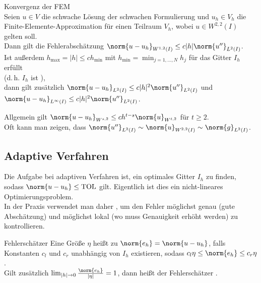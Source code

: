\begin{Satz}{Konvergenz der FEM}\\
    Seien $u \in V$ die schwache Lösung der schwachen Formulierung und
    $u_h \in V_h$ die Finite-Elemente-Appro\-ximation für einen Teilraum $V_h$,
    wobei $u \in W^{2,2}(I)$ gelten soll.\\
    Dann gilt die Fehlerabschätzung
    $\norm{u - u_h}_{W^{1,2}(I)} \le c |h| \norm{u''}_{L^2(I)}$.\\
    Ist außerdem $h_{\max} = |h| \le c h_{\min}$ mit
    $h_{\min} = \min_{j=1,\dotsc,N} h_j$ für das Gitter $I_h$ erfüllt\\
    (d.\,h. $I_h$ ist ),\\
    dann gilt zusätzlich
    $\norm{u - u_h}_{L^2(I)} \le c |h|^2 \norm{u''}_{L^2(I)}$
    und $\norm{u - u_h}_{L^\infty(I)} \le c |h|^2 \norm{u''}_{L^2(I)}$.
\end{Satz}

\begin{Bem}
    Allgemein gilt $\norm{u - u_h}_{W^{s,2}} \le c h^{t-s} \norm{u}_{W^{t,2}}$
    für $t \ge 2$.\\
    Oft kann man zeigen, dass
    $\norm{u''}_{L^2(I)} \sim \norm{u}_{W^{2,2}(I)} \sim \norm{g}_{L^2(I)}$.
\end{Bem}

\subsection{%
    Adaptive Verfahren%
}

\begin{Bem}
    Die Aufgabe bei adaptiven Verfahren ist, ein optimales Gitter $I_h$ zu
    finden, sodass $\norm{u - u_h} \le \TOL$ gilt.
    Eigentlich ist dies ein nicht-lineares Optimierungsproblem.\\
    In der Praxis verwendet man daher ,
    um den Fehler möglichst genau (gute Abschätzung) und
    möglichst lokal (wo muss Genauigkeit erhöht werden) zu kontrollieren.
\end{Bem}

\begin{Def}{Fehlerschätzer}
    Eine Größe $\eta$ heißt  zu
    $\norm{e_h} = \norm{u - u_h}$, falls Konstanten $c_l$ und $c_r$
    unabhängig von $I_h$ existieren, sodass
    $c_l \eta \le \norm{e_h} \le c_r \eta$.\\
    Gilt zusätzlich $\lim_{|h| \to 0} \frac{\norm{e_h}}{|\eta|} = 1$,
    dann heißt der Fehlerschätzer .
\end{Def}

